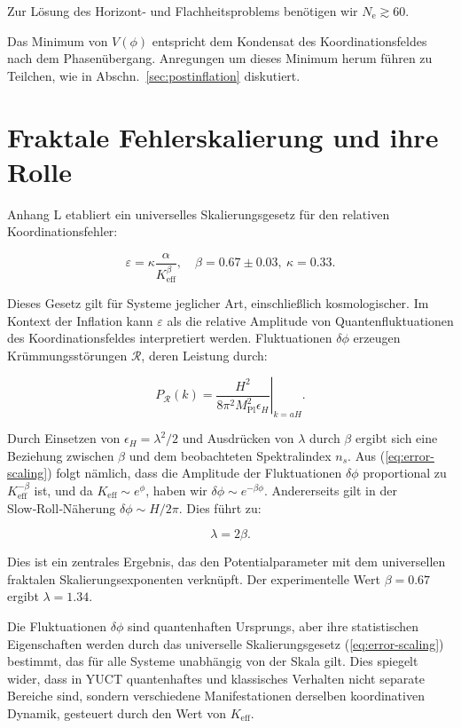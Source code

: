 \documentclass[12pt]{article}
\theoremstyle{remark}
\newcommand{\Keff}{K_{\mathrm{eff}}}
\newcommand{\eps}{\varepsilon}
\newcommand{\kappac}{\kappa}
\newcommand{\Mpl}{M_{\mathrm{Pl}}}
\newcommand{\ninf}{N_{\mathrm{e}}}
\begin{document}
	Zur Lösung des Horizont‑ und Flachheitsproblems benötigen wir $\ninf \gtrsim 60$.
	
	Das Minimum von $V(\phi)$ entspricht dem Kondensat des Koordinationsfeldes nach dem Phasenübergang. Anregungen um dieses Minimum herum führen zu Teilchen, wie in Abschn.~\ref{sec:postinflation} diskutiert.
	
	\section{Fraktale Fehlerskalierung und ihre Rolle}
	\label{sec:fractal}
	
	Anhang L etabliert ein universelles Skalierungsgesetz für den relativen Koordinationsfehler:
	
	\begin{equation}
		\eps = \kappac \frac{\alpha}{\Keff^{\beta}}, \quad \beta = 0.67 \pm 0.03,\ \kappac = 0.33.
		\label{eq:error-scaling}
	\end{equation}
	
	Dieses Gesetz gilt für Systeme jeglicher Art, einschließlich kosmologischer. Im Kontext der Inflation kann $\eps$ als die relative Amplitude von Quantenfluktuationen des Koordinationsfeldes interpretiert werden. Fluktuationen $\delta \phi$ erzeugen Krümmungsstörungen $\mathcal{R}$, deren Leistung durch:
	
	\begin{equation}
		P_{\mathcal{R}}(k) = \left. \frac{H^2}{8\pi^2 \Mpl^2 \epsilon_H} \right|_{k=aH}.
	\end{equation}
	
	Durch Einsetzen von $\epsilon_H = \lambda^2/2$ und Ausdrücken von $\lambda$ durch $\beta$ ergibt sich eine Beziehung zwischen $\beta$ und dem beobachteten Spektralindex $n_s$. Aus (\ref{eq:error-scaling}) folgt nämlich, dass die Amplitude der Fluktuationen $\delta \phi$ proportional zu $\Keff^{-\beta}$ ist, und da $\Keff \sim e^{\phi}$, haben wir $\delta \phi \sim e^{-\beta \phi}$. Andererseits gilt in der Slow‑Roll‑Näherung $\delta \phi \sim H/2\pi$. Dies führt zu:
	
	\begin{equation}
		\lambda = 2\beta.
		\label{eq:lambda-beta}
	\end{equation}
	
	Dies ist ein zentrales Ergebnis, das den Potentialparameter mit dem universellen fraktalen Skalierungsexponenten verknüpft. Der experimentelle Wert $\beta = 0.67$ ergibt $\lambda = 1.34$.
	
	Die Fluktuationen $\delta\phi$ sind quantenhaften Ursprungs, aber ihre statistischen Eigenschaften werden durch das universelle Skalierungsgesetz (\ref{eq:error-scaling}) bestimmt, das für alle Systeme unabhängig von der Skala gilt. Dies spiegelt wider, dass in YUCT quantenhaftes und klassisches Verhalten nicht separate Bereiche sind, sondern verschiedene Manifestationen derselben koordinativen Dynamik, gesteuert durch den Wert von $K_{\mathrm{eff}}$.
	
\end{document}
